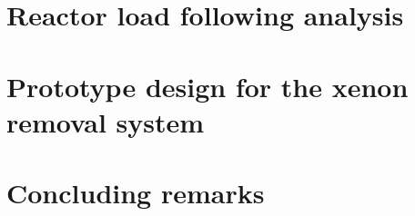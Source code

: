 \section{Reactor load following analysis}

\section{Prototype design for the xenon removal system}

\section{Concluding remarks}